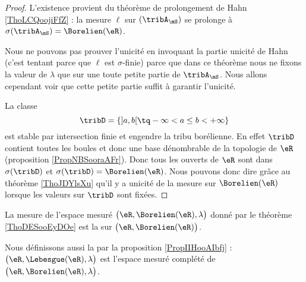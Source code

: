 \begin{proof}
    
    L'existence provient du théorème de prolongement de Hahn \ref{ThoLCQoojiFfZ} : la mesure \( \ell\) sur \( (\tribA_{\mS})\) se prolonge à \( \sigma(\tribA_{\mS})=\Borelien(\eR)\).

    Nous ne pouvons pas prouver l'unicité en invoquant la partie unicité de Hahn (c'est tentant parce que \( \ell\) est \( \sigma\)-finie) parce que dans ce théorème nous ne fixons la valeur de \( \lambda\) que sur une toute petite partie de \( \tribA_{\mS}\). Nous allons cependant voir que cette petite partie suffit à garantir l'unicité.

    La classe 
    \begin{equation}
        \tribD=\{ \mathopen] a , b \mathclose[\tq -\infty<a\leq b< +\infty \}
    \end{equation}
    est stable par intersection finie et engendre la tribu borélienne. En effet \( \tribD\) contient toutes les boules et donc une base dénombrable de la topologie de \( \eR\) (proposition \ref{PropNBSooraAFr}). Donc tous les ouverts de \( \eR\) sont dans \( \sigma(\tribD)\) et \( \sigma(\tribD)=\Borelien(\eR)\). Nous pouvons donc dire grâce au théorème \ref{ThoJDYlsXu} qu'il y a unicité de la mesure sur \( \Borelien(\eR)\) lorsque les valeurs sur \( \tribD\) sont fixées.
\end{proof}

\begin{definition}      \label{DefooYZSQooSOcyYN}
    La mesure de l'espace mesuré \( \big( \eR,\Borelien(\eR),\lambda \big)\) donné par le théorème \ref{ThoDESooEyDOe} est la  sur \( \big( \eR,\Borelien(\eR) \big)\).

    Nous définissons aussi la  par la proposition \ref{PropIIHooAIbfj} : \( \big( \eR,\Lebesgue(\eR),\lambda \big)\) est l'espace mesuré complété de \( \big( \eR,\Borelien(\eR), \lambda \big)\).
\end{definition}


